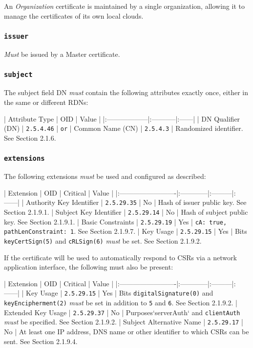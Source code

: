 An \textit{Organization} certificate is maintained by a single organization, allowing it to manage the certificates of its own local clouds.

\subsubsection{\texttt{issuer}}

\textit{Must} be issued by a Master certificate.

\subsubsection{\texttt{subject}}

The subject field DN \textit{must} contain the following attributes exactly once, either in the same or different RDNs:

| Attribute Type    | OID        | Value |
|:------------------|:-----------|:------|
| DN Qualifier (DN) | \texttt{2.5.4.46} | \texttt{or}
| Common Name (CN)  | \texttt{2.5.4.3}  |  Randomized identifier. See Section 2.1.6.

\subsubsection{\texttt{extensions}}

The following extensions \textit{must} be used and configured as described:

| Extension                | OID         | Critical | Value |
|:-------------------------|:------------|:---------|:------|
| Authority Key Identifier | \texttt{2.5.29.35} | No       | Hash of issuer public key. See Section 2.1.9.1.
| Subject Key Identifier   | \texttt{2.5.29.14} | No       | Hash of subject public key. See Section 2.1.9.1.
| Basic Constraints        | \texttt{2.5.29.19} | Yes      | \texttt{cA: true, pathLenConstraint: 1}. See Section 2.1.9.7.
| Key Usage                | \texttt{2.5.29.15} | Yes      | Bits \texttt{keyCertSign(5)} and \texttt{cRLSign(6)} \textit{must} be set. See Section 2.1.9.2.

If the certificate will be used to automatically respond to CSRs via a network application interface, the following must also be present:

| Extension                | OID         | Critical | Value |
|:-------------------------|:------------|:---------|:------|
| Key Usage                | \texttt{2.5.29.15} | Yes      | Bits \texttt{digitalSignature(0)} and \texttt{keyEncipherment(2)} \textit{must} be set in addition to \texttt{5} and \texttt{6}. See Section 2.1.9.2.
| Extended Key Usage       | \texttt{2.5.29.37} | No       | Purposes`serverAuth` and \texttt{clientAuth} \textit{must} be specified. See Section 2.1.9.2.
| Subject Alternative Name | \texttt{2.5.29.17} | No       | At least one IP address, DNS name or other identifier to which CSRs can be sent. See Section 2.1.9.4.

